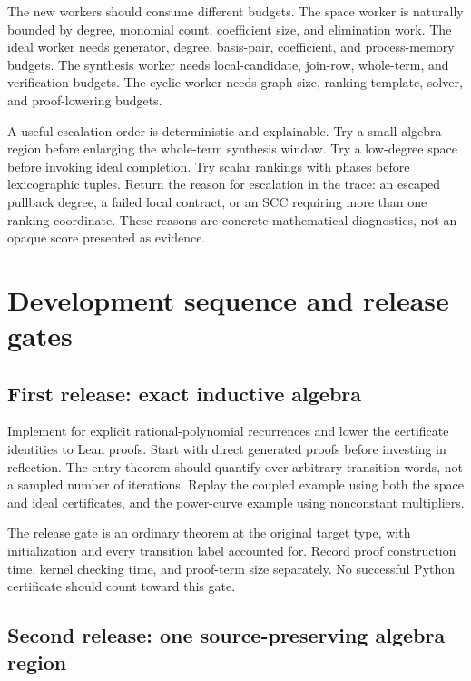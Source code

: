 The new workers should consume different budgets. The space worker is naturally
bounded by degree, monomial count, coefficient size, and elimination work. The
ideal worker needs generator, degree, basis-pair, coefficient, and process-memory
budgets. The synthesis worker needs local-candidate, join-row, whole-term, and
verification budgets. The cyclic worker needs graph-size, ranking-template,
solver, and proof-lowering budgets.

A useful escalation order is deterministic and explainable. Try a small algebra
region before enlarging the whole-term synthesis window. Try a low-degree space
before invoking ideal completion. Try scalar rankings with phases before
lexicographic tuples. Return the reason for escalation in the trace: an escaped
pullback degree, a failed local contract, or an SCC requiring more than one
ranking coordinate. These reasons are concrete mathematical diagnostics, not
an opaque score presented as evidence.

\section{Development sequence and release gates}
\label{sec:plan}

\subsection{First release: exact inductive algebra}

Implement  for explicit rational-polynomial recurrences and
lower the certificate identities to Lean proofs. Start with direct generated
 proofs before investing in reflection. The entry theorem should
quantify over arbitrary transition words, not a sampled number of iterations.
Replay the coupled example using both the space and ideal certificates, and the
power-curve example using nonconstant multipliers.

The release gate is an ordinary theorem at the original target type, with
initialization and every transition label accounted for. Record proof construction
time, kernel checking time, and proof-term size separately. No successful
Python certificate should count toward this gate.

\subsection{Second release: one source-preserving algebra region}

